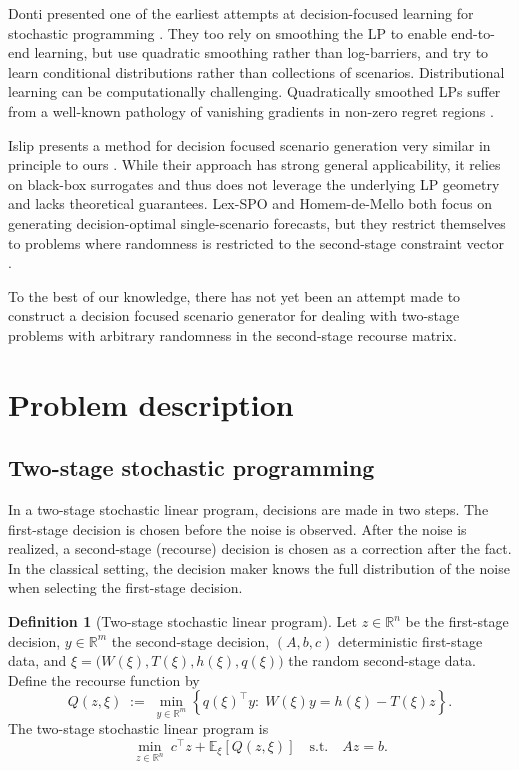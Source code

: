 \documentclass{article}
\newcommand{\R}{\mathbb{R}}
\newcommand{\E}{\mathbb{E}}
\theoremstyle{plain}
\theoremstyle{definition}
\newtheorem{definition}{Definition}
\theoremstyle{remark}
\begin{document}
Donti presented one of the earliest attempts at decision-focused learning for stochastic programming \cite{donti}. They too rely on smoothing the LP to enable end-to-end learning, but use quadratic smoothing rather than log-barriers, and try to learn conditional distributions rather than collections of scenarios. Distributional learning can be computationally challenging. Quadratically smoothed LPs suffer from a well-known pathology of vanishing gradients in non-zero regret regions \cite{quad-vanish-1,quad-vanish-2,quad-vanish-3}.

Islip presents a method for decision focused scenario generation very similar in principle to ours \cite{islip}. While their approach has strong general applicability, it relies on black-box surrogates and thus does not leverage the underlying LP geometry and lacks theoretical guarantees. Lex-SPO and Homem-de-Mello both focus on generating decision-optimal single-scenario forecasts, but they restrict themselves to problems where randomness is restricted to the second-stage constraint vector \cite{lex-spo,homem-de-mello}.

To the best of our knowledge, there has not yet been an attempt made to construct a decision focused scenario generator for dealing with two-stage problems with arbitrary randomness in the second-stage recourse matrix.

\section{Problem description}
\label{sec:problem}

\subsection{Two-stage stochastic programming}
\label{sec:two-stage}
In a two-stage stochastic linear program, decisions are made in two steps. The first-stage decision is chosen before the noise is observed. After the noise is realized, a second-stage (recourse) decision is chosen as a correction after the fact. In the classical setting, the decision maker knows the full distribution of the noise when selecting the first-stage decision.

\begin{definition}[Two-stage stochastic linear program]
\label{def:two-stage-slp}
Let $z\in\R^n$ be the first-stage decision, $y\in\R^m$ the second-stage decision, $(A,b,c)$ deterministic first-stage data, and $\xi=\big(W(\xi),T(\xi),h(\xi),q(\xi)\big)$ the random second-stage data.
Define the recourse function by
\begin{equation}
\label{eq:recourse-function}
Q(z,\xi)\;:=\;\min_{y\in\R^m}\left\{q(\xi)^\top y:\;W(\xi)y=h(\xi)-T(\xi)z\right\}.
\end{equation}
The two-stage stochastic linear program is
\begin{equation}
\label{eq:two-stage-slp}
\min_{z\in\R^n}\ c^\top z+\E_{\xi}\!\left[Q(z,\xi)\right]
\quad\text{s.t.}\quad Az=b.
\end{equation}
\end{definition}
\end{document}
